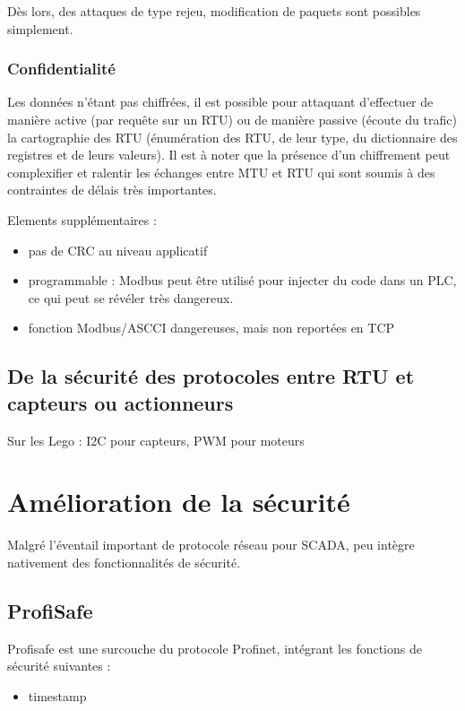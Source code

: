 \documentclass[10pt,a4paper]{article}
\begin{document}
	        Dès lors, des attaques de type rejeu, modification de paquets sont possibles simplement.
        
        \subsubsection{Confidentialité}
	        Les données n'étant pas chiffrées, il est possible pour attaquant d'effectuer de manière active (par requête sur un RTU) ou de manière passive (écoute du trafic) la cartographie des RTU (énumération des RTU, de leur type, du dictionnaire des registres et de leurs valeurs).
	        Il est à noter que la présence d'un chiffrement peut complexifier et ralentir les échanges entre MTU et RTU qui sont soumis à des contraintes de délais très importantes.



Elements supplémentaires :
    \begin{itemize}
    \item pas de CRC au niveau applicatif
    \item programmable : Modbus peut être utilisé pour injecter du code dans un PLC, ce qui peut se révéler très dangereux.
    \item fonction Modbus/ASCCI dangereuses, mais non reportées en TCP
    \end{itemize}


    \subsection{De la sécurité des protocoles entre RTU et capteurs ou actionneurs}

    Sur les Lego : I2C pour capteurs, PWM pour moteurs


\section{Amélioration de la sécurité}

	Malgré l'éventail important de protocole réseau pour SCADA, peu intègre nativement des fonctionnalités de sécurité.

	\subsection{ProfiSafe}
    Profisafe est une surcouche du protocole Profinet, intégrant les fonctions de sécurité suivantes :
    \begin{itemize}
    \item timestamp
    \
    \end{itemize}
	
\end{document}
